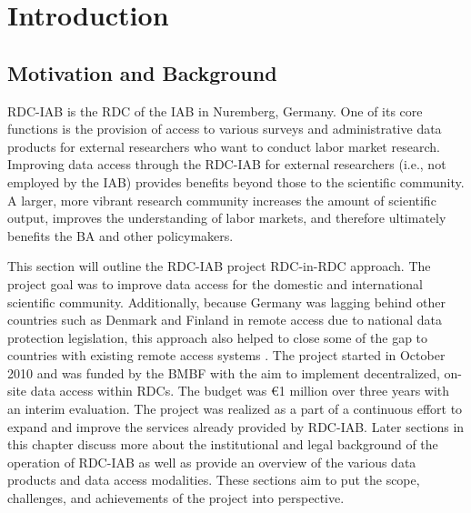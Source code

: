 \hypertarget{introduction-2}{%
\section{Introduction}\label{introduction-2}}

\hypertarget{motivation-and-background}{%
\subsection{Motivation and Background}\label{motivation-and-background}}

RDC-IAB is the RDC of the IAB in Nuremberg, Germany. One of its core functions is the provision of access to various surveys and administrative data products for external researchers who want to conduct labor market research. Improving data access through the RDC-IAB for external researchers (i.e., not employed by the IAB) provides benefits beyond those to the scientific community. A larger, more vibrant research community increases the amount of scientific output, improves the understanding of labor markets, and therefore ultimately benefits the BA and other policymakers.

This section will outline the RDC-IAB project RDC-in-RDC approach. The project goal was to improve data access for the domestic and international scientific community. Additionally, because Germany was lagging behind other countries such as Denmark and Finland in remote access due to national data protection legislation, this approach also helped to close some of the gap to countries with existing remote access systems \citep{bender2011, wirth2019}. The project started in October 2010 and was funded by the BMBF with the aim to implement decentralized, on-site data access within RDCs. The budget was €1 million over three years with an interim evaluation. The project was realized as a part of a continuous effort to expand and improve the services already provided by RDC-IAB. Later sections in this chapter discuss more about the institutional and legal background of the operation of RDC-IAB as well as provide an overview of the various data products and data access modalities. These sections aim to put the scope, challenges, and achievements of the project into perspective.

